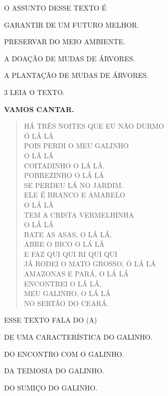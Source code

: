 
O ASSUNTO DESSE TEXTO É

\begin{escolha}
\item GARANTIR DE UM FUTURO MELHOR.

\item PRESERVAR DO MEIO AMBIENTE.

\item A DOAÇÃO DE MUDAS DE ÁRVORES.

\item A PLANTAÇÃO DE MUDAS DE ÁRVORES.
\end{escolha}

\num{3} LEIA O TEXTO.

\textbf{VAMOS CANTAR.}

\begin{verse}
HÁ TRÊS NOITES QUE EU NÃO DURMO\\
Ó LÁ LÁ\\
POIS PERDI O MEU GALINHO\\
O LÁ LÁ\\
COITADINHO O LÁ LÁ,\\
POBREZINHO O LÁ LÁ\\
SE PERDEU LÁ NO JARDIM.\\
ELE É BRANCO E AMARELO\\
O LÁ LÁ\\
TEM A CRISTA VERMELHINHA\\
O LÁ LÁ\\
BATE AS ASAS, O LÁ LÁ,\\
ABRE O BICO O LÁ LÁ\\
E FAZ QUI QUI RI QUI QUI\\
JÁ RODEI O MATO GROSSO, Ó LÁ LÁ\\
AMAZONAS E PARÁ, O LÁ LÁ\\
ENCONTREI O LÁ LÁ,\\
MEU GALINHO, O LÁ LÁ\\
NO SERTÃO DO CEARÁ.
\end{verse}


ESSE TEXTO FALA DO (A)

\begin{escolha}
\item DE UMA CARACTERÍSTICA DO GALINHO.

\item DO ENCONTRO COM O GALINHO.

\item DA TEIMOSIA DO GALINHO.

\item DO SUMIÇO DO GALINHO.
\end{escolha}

